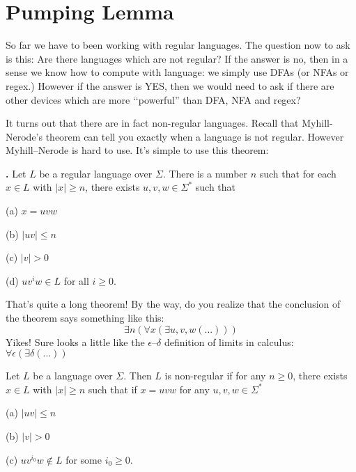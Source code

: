 \section{Pumping Lemma}

So far we have to been working 
with regular languages.
The question now to ask is this:
Are there languages which are not regular?
If the answer is no, then in a sense we know how to compute with language:
we simply use DFAs (or NFAs or regex.)
However if the answer is YES, then we would need to ask if there are other
devices which are more \lq\lq powerful'' than
DFA, NFA and regex?

It turns out that there are in fact non-regular languages.
Recall that Myhill-Nerode's theorem can tell you exactly
when a language is not regular.
However Myhill--Nerode is hard to use.
It's simple to use this theorem:

\begin{thm}\textbf{.}
Let $L$ be a regular language over $\Sigma$. There is a number $n$
such that for each $x \in L$ with $|x| \geq n$, there exists $u,v,w
\in \Sigma^*$ such that
\begin{tightlist}
  \item[\textnormal{(a)}] $x = uvw$
  \item[\textnormal{(b)}] $|uv| \leq n$
  \item[\textnormal{(c)}] $|v| > 0$
  \item[\textnormal{(d)}] $uv^iw \in L$ for all $i \geq 0$.
\end{tightlist}
\end{thm}

That's quite a long theorem!
By the way, do you realize that the conclusion of the theorem
says something like this:
\[
\exists n \left( \forall x \left( \exists u,v,w (...) \right) \right)
\]
Yikes!
Sure looks a little like the $\epsilon$--$\delta$ definition
of limits in calculus:
$\forall \epsilon ( \exists \delta (...))$

\begin{cor}
Let $L$ be a language over $\Sigma$. Then $L$ is non-regular if for
any $n \geq 0$, there exists $x \in L$ with $|x| \geq n$ such
that if $x=uvw$ for any $u,v,w \in \Sigma^*$
 \begin{tightlist}
  \item[\textnormal{(a)}] $|uv| \leq n$
  \item[\textnormal{(b)}] $|v| > 0$
  \item[\textnormal{(c)}] $uv^{i_0}w \notin L$ for some $i_0 \geq 0$.
 \end{tightlist}
\end{cor}

